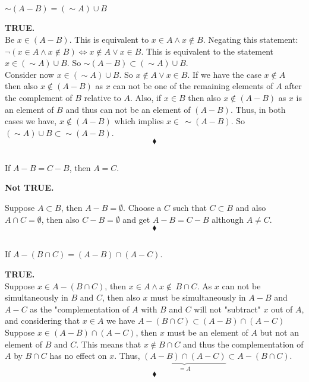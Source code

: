 \subsection{}
\begin{tcolorbox}
$\sim(A-B)=(\sim A)\cup B$
\end{tcolorbox}
\textbf{TRUE.}\\
Be $x\in (A-B)$. This is equivalent to $x \in  A \wedge x \not\in B $. Negating this statement: $\lnot(x \in  A \wedge x \not\in B )\Leftrightarrow x \not \in  A \vee x \in B $. This is equivalent to the statement $x\in (\sim A)\cup B$. So $\sim(A-B)\subset (\sim A)\cup B$.\\
Consider now $x\in (\sim A)\cup B$. So $x \not \in  A \vee x \in B $. If we have the case $x \not \in  A $ then also $x\not \in (A-B)$ as $x$ can not be one of the remaining elements of $A$ after the complement of $B$ relative to $A$. Also, if  $x \in  B $ then also $x\not \in (A-B)$ as $x$ is an element of $B$ and thus can not be an element of $(A-B)$. Thus, in both cases we have, $x\not \in (A-B)$ which implies $x \in\, \sim (A-B)$. So $ (\sim A)\cup B\subset\sim(A-B)$.\\
$$\blacklozenge$$

\subsection{}
\begin{tcolorbox}
If $A-B=C-B$, then $A=C$.
\end{tcolorbox}
\textbf{Not TRUE.}\\
\begin{figure}[H]%
    \centering
    \subfloat[If $A-B=C-B\not\Rightarrow A=C$ ]{}
\label{fig:fig_p8b}
\end{figure}
Suppose $A\subset B$, then $A-B=\emptyset$. Choose a $C$ such that $C\subset B$ and also $A\cap C=\emptyset$, then also $C-B=\emptyset$ and get $A-B=C-B$ although $A\ne C$.
$$\blacklozenge$$

\subsection{}
\begin{tcolorbox}
If $A-(B\cap C)=(A-B)\cap (A-C)$.
\end{tcolorbox}
\textbf{TRUE.}\\

Suppose $x\in A-(B\cap C)$, then $x\in A \wedge x\not\in \,B\cap C$. As $x$ can not be simultaneously in $B$ and $C$, then also $x$ must be simultaneously in $A-B$ and $A-C$ as the "complementation of $A$ with $B$ and $C$ will not "subtract" $x$ out of $A$,  and considering that $x\in A$ we have $A-(B\cap C)\subset(A-B)\cap (A-C)$\\
Suppose $x\in (A-B)\cap (A-C)$, then $x$ must be an element of $A$ but not an element of $B$ and $C$. This means that $x\not\in B\cap C$ and thus the complementation of $A$ by $B\cap C$ has no effect on $x$. Thus, $\underbrace{(A-B)\cap (A-C)}_{= A} \subset A-(B\cap C)$.
$$\blacklozenge$$
\newpage
